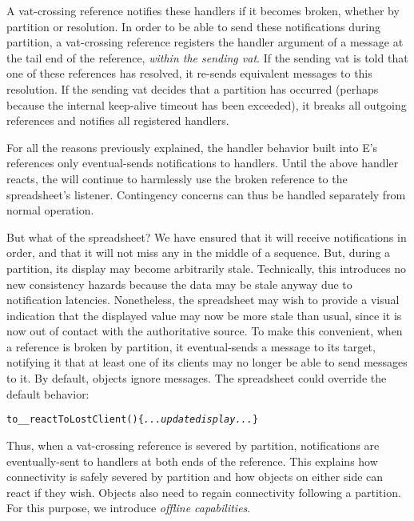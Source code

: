 \documentclass{llncs}
\begin{document}
A vat-crossing reference notifies these handlers if it becomes broken,
whether by partition or resolution. In order to be able to send these
notifications during partition, a vat-crossing reference registers the
handler argument of a  message at the tail end of
the reference, \emph{within the sending vat}. If the sending vat is
told that one of these references has resolved, it re-sends equivalent
 messages to this resolution. If the sending vat
decides that a partition has occurred (perhaps because the internal
keep-alive timeout has been exceeded), it breaks all outgoing
references and notifies all registered handlers.

For all the reasons previously explained, the handler behavior built
into E's references only eventual-sends notifications to
handlers. Until the above handler reacts, the  will
continue to harmlessly use the broken reference to the spreadsheet's
listener. Contingency concerns can thus be handled separately from normal
operation.

But what of the spreadsheet? We have ensured that it will receive
 notifications in order, and that it will not miss
any in the middle of a sequence. But, during a partition, its display
may become arbitrarily stale. Technically, this introduces no new
consistency hazards because the data may be stale anyway due to
notification latencies. Nonetheless, the spreadsheet may wish to
provide a visual indication that the displayed value may now be more
stale than usual, since it is now out of contact with the
authoritative source. To make this convenient, when a reference is
broken by partition, it eventual-sends a 
message to its target, notifying it that at least one of its clients
may no longer be able to send messages to it. By default, objects
ignore  messages. The spreadsheet could
override the default behavior:
%
\begin{alltt}
    to \_\_reactToLostClient() \{ {\it ...update display...} \}
\end{alltt}
%
Thus, when a vat-crossing reference is severed by partition,
notifications are eventually-sent to handlers at both ends of the
reference.  This explains how connectivity is safely severed by
partition and how objects on either side can react if they wish. 
Objects also need to regain connectivity following a partition. For
this purpose, we introduce \emph{offline capabilities}.
\end{document}
